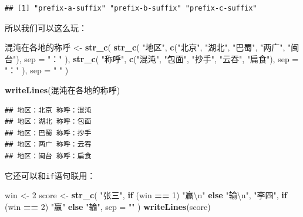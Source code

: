 \documentclass[]{book}
\newenvironment{Shaded}{\begin{snugshade}}{\end{snugshade}}
\newcommand{\CharTok}[1]{\textcolor[rgb]{0.31,0.60,0.02}{#1}}
\newcommand{\ControlFlowTok}[1]{\textcolor[rgb]{0.13,0.29,0.53}{\textbf{#1}}}
\newcommand{\DataTypeTok}[1]{\textcolor[rgb]{0.13,0.29,0.53}{#1}}
\newcommand{\DecValTok}[1]{\textcolor[rgb]{0.00,0.00,0.81}{#1}}
\newcommand{\KeywordTok}[1]{\textcolor[rgb]{0.13,0.29,0.53}{\textbf{#1}}}
\newcommand{\NormalTok}[1]{#1}
\newcommand{\OperatorTok}[1]{\textcolor[rgb]{0.81,0.36,0.00}{\textbf{#1}}}
\newcommand{\StringTok}[1]{\textcolor[rgb]{0.31,0.60,0.02}{#1}}
\begin{document}
\begin{verbatim}
## [1] "prefix-a-suffix" "prefix-b-suffix" "prefix-c-suffix"
\end{verbatim}

所以我们可以这么玩：

\begin{Shaded}
\begin{Highlighting}[]
\NormalTok{混沌在各地的称呼 <-}\StringTok{ }\KeywordTok{str_c}\NormalTok{(}
  \KeywordTok{str_c}\NormalTok{(}
    \StringTok{"地区"}\NormalTok{,}
    \KeywordTok{c}\NormalTok{(}\StringTok{"北京"}\NormalTok{, }\StringTok{"湖北"}\NormalTok{, }\StringTok{"巴蜀"}\NormalTok{, }\StringTok{"两广"}\NormalTok{, }\StringTok{"闽台"}\NormalTok{),}
    \DataTypeTok{sep =} \StringTok{"："}
\NormalTok{  ),}
  \KeywordTok{str_c}\NormalTok{(}
    \StringTok{"称呼"}\NormalTok{,}
    \KeywordTok{c}\NormalTok{(}\StringTok{"混沌"}\NormalTok{, }\StringTok{"包面"}\NormalTok{, }\StringTok{"抄手"}\NormalTok{, }\StringTok{"云吞"}\NormalTok{, }\StringTok{"扁食"}\NormalTok{),}
    \DataTypeTok{sep =} \StringTok{"："}
\NormalTok{  ),}
  \DataTypeTok{sep =} \StringTok{" "}
\NormalTok{)}

\KeywordTok{writeLines}\NormalTok{(混沌在各地的称呼)}
\end{Highlighting}
\end{Shaded}

\begin{verbatim}
## 地区：北京 称呼：混沌
## 地区：湖北 称呼：包面
## 地区：巴蜀 称呼：抄手
## 地区：两广 称呼：云吞
## 地区：闽台 称呼：扁食
\end{verbatim}

它还可以和\texttt{if}语句联用：

\begin{Shaded}
\begin{Highlighting}[]
\NormalTok{win <-}\StringTok{ }\DecValTok{2}
\NormalTok{score <-}\StringTok{ }\KeywordTok{str_c}\NormalTok{(}
  \StringTok{"张三"}\NormalTok{, }
  \ControlFlowTok{if}\NormalTok{ (win }\OperatorTok{==}\StringTok{ }\DecValTok{1}\NormalTok{) }\StringTok{"赢}\CharTok{\textbackslash{}n}\StringTok{"} \ControlFlowTok{else} \StringTok{"输}\CharTok{\textbackslash{}n}\StringTok{"}\NormalTok{,}
  \StringTok{"李四"}\NormalTok{,}
  \ControlFlowTok{if}\NormalTok{ (win }\OperatorTok{==}\StringTok{ }\DecValTok{2}\NormalTok{) }\StringTok{"赢"} \ControlFlowTok{else} \StringTok{"输"}\NormalTok{,}
  \DataTypeTok{sep =} \StringTok{""}
\NormalTok{)}
\KeywordTok{writeLines}\NormalTok{(score)}
\end{Highlighting}
\end{Shaded}
\end{document}
